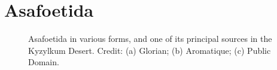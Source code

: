 


\section{Asafoetida}
\label{sec:asafoetida}



\begin{figure}[!ht]
	\vspace{-4ex}
	\centering
	\hfill
	\hfill
	\caption[Asafoetida in various forms.]{Asafoetida in various forms, and one of its principal sources  in the Kyzylkum Desert. Credit: (a) Glorian; (b) Aromatique; (c) Public Domain.}
	\label{fig:asafoetida_imgs}
\end{figure}

